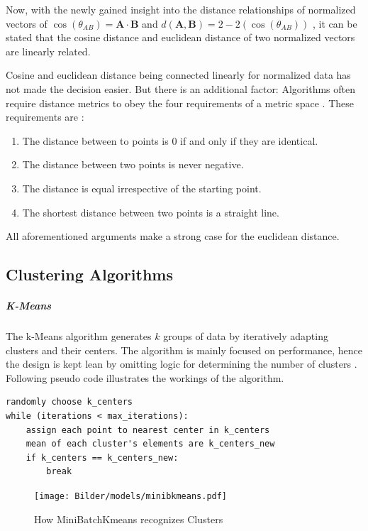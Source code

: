 		Now, with the newly gained insight into the distance relationships of normalized vectors of $\cos(\theta_{AB}) = \mathbf{A} \cdot \mathbf{B}$ and $d(\mathbf{A}, \mathbf{B}) = 2 - 2(\cos(\theta_{AB}))$ , it can be stated that the cosine distance and euclidean distance of two normalized vectors are linearly related.
				
		Cosine and euclidean distance being connected linearly for normalized data has not made the decision easier. But there is an additional factor: 
		Algorithms often require distance metrics to obey the four requirements of a metric space \cite{schubertTriangleInequalityCosine2021}.
		These requirements are \cite{rajaramanNeighborSearchHigh}:
		\begin{enumerate}
			\item The distance between to points is 0 if and only if they are identical.
			\item The distance between two points is never negative.
			\item The distance is equal irrespective of the starting point.
			\item The shortest distance between two points is a straight line.
		\end{enumerate} 
		
		All aforementioned arguments make a strong case for the euclidean distance.
		
\subsection{Clustering Algorithms}
		
		\subparagraph{K-Means}
		The k-Means algorithm generates $k$ groups of data by iteratively adapting clusters and their centers. The algorithm is mainly focused on performance, hence the design is kept lean by omitting logic for determining the number of clusters \cite[c.6.2]{40algorithms}. Following pseudo code illustrates the workings of the algorithm.
		
		\begin{lstlisting}
randomly choose k_centers
while (iterations < max_iterations):
	assign each point to nearest center in k_centers
	mean of each cluster's elements are k_centers_new
	if k_centers == k_centers_new:
		break
		\end{lstlisting}
	
			 \begin{figure}[!h]
		\centering
		\texttt{[image: Bilder/models/minibkmeans.pdf]}
		\caption[How MiniBatchKmeans recognizes Clusters]{How MiniBatchKmeans recognizes Clusters \cite{sklearn}}
		\label{fig:kmeans-viz}
		\end{figure}
	

